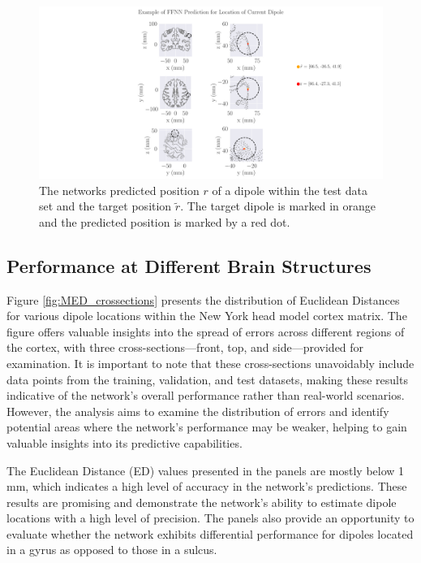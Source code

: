 \documentclass[a4paper, UKenglish, 11pt]{uiomaster}
\begin{document}
\begin{figure}
  \hspace*{-10cm}
  \includegraphics[width=28cm]{figures/FFNN_single_dipole_prediction.pdf}
  \caption{The networks predicted position $r$ of a dipole within the test data set and the target position $\tilde{r}$. The target dipole is marked in orange and the predicted position is marked by a red dot.}
  \label{fig:prediction_FFNN_example}
\end{figure}

\subsection{Performance at Different Brain Structures}

Figure \ref{fig:MED_crossections} presents the distribution of Euclidean Distances for various dipole locations within the New York head model cortex matrix. The figure offers valuable insights into the spread of errors across different regions of the cortex, with three cross-sections—front, top, and side—provided for examination. It is important to note that these cross-sections unavoidably include data points from the training, validation, and test datasets, making these results indicative of the network's overall performance rather than real-world scenarios. However, the analysis aims to examine the distribution of errors and identify potential areas where the network's performance may be weaker, helping to gain valuable insights into its predictive capabilities.

The Euclidean Distance (ED) values presented in the panels are mostly below 1 mm, which indicates a high level of accuracy in the network's predictions. These results are promising and demonstrate the network's ability to estimate dipole locations with a high level of precision. The panels also provide an opportunity to evaluate whether the network exhibits differential performance for dipoles located in a gyrus as opposed to those in a sulcus.
\end{document}
